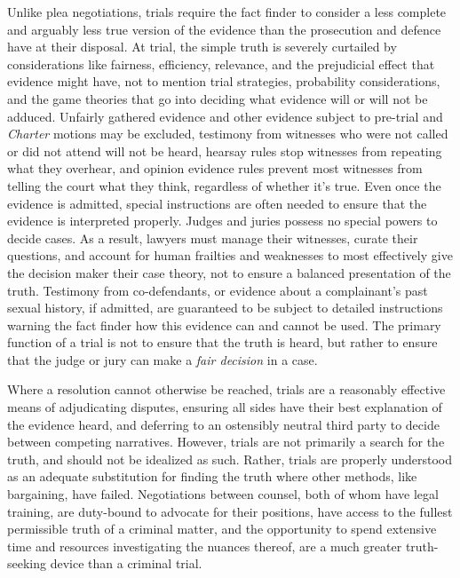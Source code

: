 Unlike plea negotiations, trials require the fact finder to consider a less complete and arguably less true version of the evidence than the prosecution and defence have at their disposal. At trial, the simple truth is severely curtailed by considerations like fairness, efficiency, relevance, and the prejudicial effect that evidence might have, not to mention trial strategies, probability considerations, and the game theories that go into deciding what evidence will or will not be adduced. Unfairly gathered evidence and other evidence subject to pre-trial and \textit{Charter} motions may be excluded, testimony from witnesses who were not called or did not attend will not be heard, hearsay rules stop witnesses from repeating what they overhear, and opinion evidence rules prevent most witnesses from telling the court what they think, regardless of whether it's true. Even once the evidence is admitted, special instructions are often needed to ensure that the evidence is interpreted properly. Judges and juries possess no special powers to decide cases. As a result, lawyers must manage their witnesses, curate their questions, and account for human frailties and weaknesses to most effectively give the decision maker their case theory, not to ensure a balanced presentation of the truth. Testimony from co-defendants, or evidence about a complainant's past sexual history, if admitted, are guaranteed to be subject to detailed instructions warning the fact finder how this evidence can and cannot be used. The primary function of a trial is not to ensure that the truth is heard, but rather to ensure that the judge or jury can make a \textit{fair decision} in a case. 

Where a resolution cannot otherwise be reached, trials are a reasonably effective means of adjudicating disputes, ensuring all sides have their best explanation of the evidence heard, and deferring to an ostensibly neutral third party to decide between competing narratives. However, trials are not primarily a search for the truth, and should not be idealized as such. Rather, trials are properly understood as an adequate substitution for finding the truth where other methods, like bargaining, have failed. Negotiations between counsel, both of whom have legal training, are duty-bound to advocate for their positions, have access to the fullest permissible truth of a criminal matter, and the opportunity to spend extensive time and resources investigating the nuances thereof, are a much greater truth-seeking device than a criminal trial.

